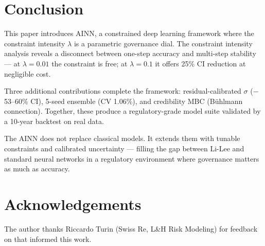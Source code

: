 \documentclass[11pt,a4paper]{article}
\begin{document}
\section{Conclusion}

This paper introduces AINN, a constrained deep learning framework where the constraint intensity $\lambda$ is a parametric governance dial. The constraint intensity analysis reveals a disconnect between one-step accuracy and multi-step stability --- at $\lambda = 0.01$ the constraint is free; at $\lambda = 0.1$ it offers 25\% CI reduction at negligible cost.

Three additional contributions complete the framework: residual-calibrated $\sigma$ ($-$53--60\% CI), 5-seed ensemble (CV 1.06\%), and credibility MBC (B\"uhlmann connection). Together, these produce a regulatory-grade model suite validated by a 10-year backtest on real data.

The AINN does not replace classical models. It extends them with tunable constraints and calibrated uncertainty --- filling the gap between Li-Lee and standard neural networks in a regulatory environment where governance matters as much as accuracy.

\section*{Acknowledgements}
The author thanks Riccardo Turin (Swiss Re, L\&H Risk Modeling) for feedback on \cite{rindori2026p04} that informed this work.

\newpage


\end{document}
